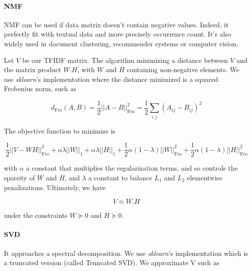 \documentclass[a4paper]{article}
\begin{document}
	\paragraph{\acf{NMF}}
		
	\ac{NMF} can be used if data matrix doesn't contain negative values. Indeed, it perfectly fit with textual data and more precisely occurrence count. It's also widely used in document clustering, recommender systems or computer vision. 
	

	Let $V$ be our \ac{TFIDF} matrix. The algorithm minimizing a distance between $V$ and the matrix product $W.H$, with $W$ and $H$ containing non-negative elements. We use \emph{sklearn}'s implementation where the distance minimized is a squared Frobenius norm, such as
	
	\begin{equation}
		d_{\mathrm{Fro}}(A, B) = \frac{1}{2} ||A - B||_{\mathrm{Fro}}^2 = \frac{1}{2} \sum_{i,j} (A_{ij} - {B}_{ij})^2
	\end{equation}
		
	The objective function to minimize is
	
	\begin{equation}
	\frac{1}{2} ||V - WH||_{\mathrm{Fro}}^2 + \alpha\lambda||W||_{1} + \alpha\lambda||H||_{1} + \frac{1}{2}\alpha(1 - \lambda)||W||_{\mathrm{Fro}}^2 + \frac{1}{2}\alpha(1 - \lambda)||H||_{\mathrm{Fro}}^2
	\end{equation}
	
	with $\alpha$ a constant that multiplies the regularization terms, and so controls the sparsity of $W$ and $H$, and $\lambda$ a constant to balance $L_{1}$ and $L_{2}$ elementwise penalizations. Ultimately, we have
	
	\begin{equation}
		V \approx W.H
	\end{equation}
	
	under the constraints $W \succeq 0$ and $H \succeq 0$.
	
	\paragraph{\acf{SVD}}
	
	It approaches a spectral decomposition. We use \emph{sklearn}'s implementation which is a truncated version (called Truncated \ac{SVD}). We approximate V such as
	
\end{document}

